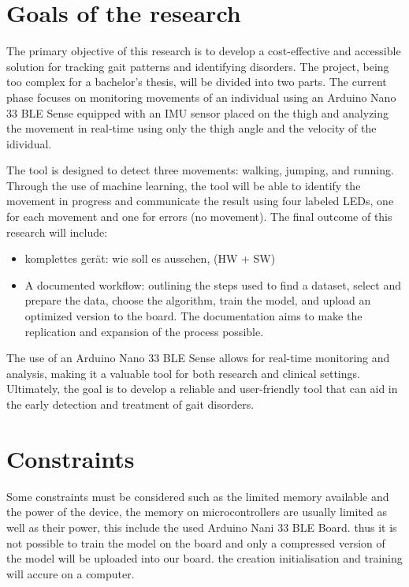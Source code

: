 \section{Goals of the research}

The primary objective of this research is to develop a cost-effective and accessible solution for tracking gait patterns and identifying disorders. The project, being too complex for a bachelor's thesis, will be divided into two parts. The current phase focuses on monitoring movements of an individual using an Arduino Nano 33 BLE Sense equipped with an IMU sensor placed on the thigh and analyzing the movement in real-time using only the thigh angle and the velocity of the idividual. 

The tool is designed to detect three movements: walking, jumping, and running. Through the use of machine learning, the tool will be able to identify the movement in progress and communicate the result using four labeled LEDs, one for each movement and one for errors (no movement). The final outcome of this research will include:

\begin{itemize}
	\item komplettes gerät: wie soll es aussehen, (HW + SW)
	\item A documented workflow: outlining the steps used to find a dataset, select and prepare the data, choose the algorithm, train the model, and upload an optimized version to the board. The documentation aims to make the replication and expansion of the process possible.
\end{itemize}

The use of an Arduino Nano 33 BLE Sense allows for real-time monitoring and analysis, making it a valuable tool for both research and clinical settings. Ultimately, the goal is to develop a reliable and user-friendly tool that can aid in the early detection and treatment of gait disorders.

\section{Constraints}
Some constraints must be considered such as the limited memory available and the power of the device, the memory on microcontrollers are usually limited as well as their power, this include the used Arduino Nani 33 BLE Board. thus it is not possible to train the model on the board and only a compressed version of the model will be uploaded into our board. the creation initialisation and training will accure on a computer. 
\cite{ArduinoNano33BLESense:2023}


